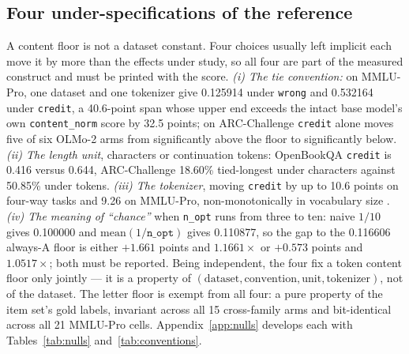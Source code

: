 \subsection{Four under-specifications of the reference}
\label{sec:nulls}

A content floor is not a dataset constant. Four choices usually left implicit each move it by more than the effects under study, so all four are part of the measured construct and must be printed with the score. \emph{(i) The tie convention:} on MMLU-Pro, one dataset and one tokenizer give 0.125914 under \texttt{wrong} and 0.532164 under \texttt{credit}, a 40.6-point span whose upper end exceeds the intact base model's own \texttt{content\_norm} score by 32.5 points; on ARC-Challenge \texttt{credit} alone moves five of six OLMo-2 arms from significantly above the floor to significantly below. \emph{(ii) The length unit}, characters or continuation tokens: OpenBookQA \texttt{credit} is 0.416 versus 0.644, ARC-Challenge 18.60\% tied-longest under characters against 50.85\% under tokens. \emph{(iii) The tokenizer}, moving \texttt{credit} by up to 10.6 points on four-way tasks and 9.26 on MMLU-Pro, non-monotonically in vocabulary size \citep{oostermeijer2026length}. \emph{(iv) The meaning of ``chance''} when \texttt{n\_opt} runs from three to ten: naive $1/10$ gives 0.100000 and $\mathrm{mean}(1/\texttt{n\_opt})$ gives 0.110877, so the gap to the 0.116606 always-A floor is either $+1.661$ points and $1.1661\times$ or $+0.573$ points and $1.0517\times$; both must be reported. Being independent, the four fix a token content floor only jointly --- it is a property of $(\text{dataset},\text{convention},\text{unit},\text{tokenizer})$, not of the dataset. The letter floor is exempt from all four: a pure property of the item set's gold labels, invariant across all 15 cross-family arms and bit-identical across all 21 MMLU-Pro cells. Appendix~\ref{app:nulls} develops each with Tables~\ref{tab:nulls} and~\ref{tab:conventions}.
